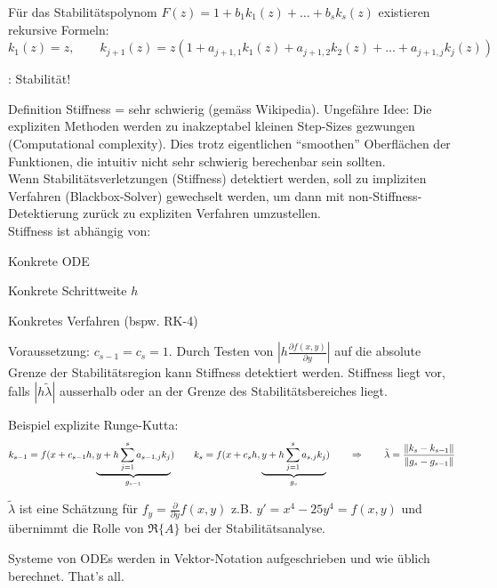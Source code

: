       \vspace{1em}
       
        Für das Stabilitätspolynom $F(z) = 1 + b_1 k_1(z) + \ldots + b_sk_s(z)$ existieren
        rekursive Formeln:\\
        $k_1(z) = z, \qquad k_{j+1}(z) = z(1 + a_{j+1,1} k_1(z) + a_{j+1,2} k_2(z) + \ldots + a_{j+1,j} k_j(z))$

      \vspace{1em}
      : Stabilität!

      Definition Stiffness = sehr schwierig (gemäss Wikipedia). Ungefähre Idee: Die expliziten
      Methoden werden zu inakzeptabel kleinen Step-Sizes gezwungen (Computational complexity).
      Dies trotz eigentlichen "`smoothen"' Oberflächen der Funktionen, die intuitiv nicht sehr
      schwierig berechenbar sein sollten. \\

      Wenn Stabilitätsverletzungen (Stiffness) detektiert werden, soll zu
      impliziten Verfahren (Blackbox-Solver) gewechselt werden, um dann mit non-Stiffness-Detektierung
      zurück zu expliziten Verfahren umzustellen.\\

      Stiffness ist abhängig von:
      \begin{liste}
        \item Konkrete ODE
        \item Konkrete Schrittweite $h$
        \item Konkretes Verfahren (bspw. RK-4)
      \end{liste}

        Voraussetzung: $c_{s-1} = c_s = 1$. Durch Testen von $\left|h \frac{\partial f(x,y)}{\partial y} \right|$
        auf die absolute Grenze der Stabilitätsregion kann
        Stiffness detektiert werden.
        Stiffness liegt vor, falls $|h \tilde{\lambda}|$ ausserhalb
        oder an der Grenze des Stabilitätsbereiches liegt.


        Beispiel explizite Runge-Kutta:
        $$k_{s-1} = f(x+c_{s-1} h, \underbrace{y + h \sum\limits_{j=1}^s a_{s-1,j}k_j}_{g_{s-1}}) \qquad
        k_{s} = f(x+c_{s} h, \underbrace{y + h \sum\limits_{j=1}^s a_{s,j}k_j}_{g_{s}}) \qquad
        \Rightarrow \qquad \tilde{\lambda} = \frac{\Arrowvert k_s - k_{s-1} \Arrowvert}{\Arrowvert g_s - g_{s-1} \Arrowvert}$$

        $\tilde{\lambda}$ ist eine Schätzung für $f_y = \frac{\partial}{\partial y}f(x,y)$ z.B. $y'=x^4-25y^4=f(x,y)$
         und übernimmt die Rolle von $\Re \{A\}$ bei der Stabilitätsanalyse.


    Systeme von ODEs werden in Vektor-Notation aufgeschrieben und wie üblich berechnet.
    That's all.
